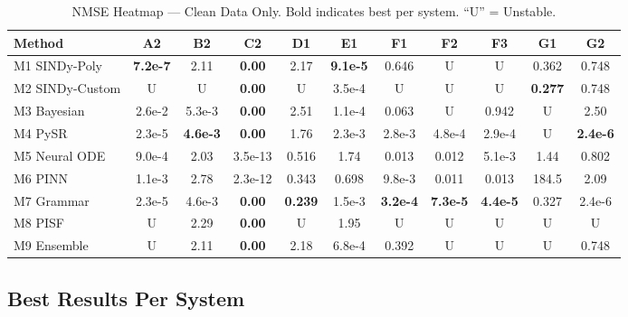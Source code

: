 \documentclass[conference]{IEEEtran}
\begin{document}
\begin{table}[!ht]
\centering
\caption{NMSE Heatmap --- Clean Data Only. Bold indicates best per system. ``U'' = Unstable.}
\label{tab:heatmap}
\small
\begin{tabular}{@{}l|cccccccccc@{}}
\toprule
\textbf{Method} & \textbf{A2} & \textbf{B2} & \textbf{C2} & \textbf{D1} & \textbf{E1} & \textbf{F1} & \textbf{F2} & \textbf{F3} & \textbf{G1} & \textbf{G2} \\
\midrule
M1 SINDy-Poly & \textbf{7.2e-7} & 2.11 & \textbf{0.00} & 2.17 & \textbf{9.1e-5} & 0.646 & U & U & 0.362 & 0.748 \\
M2 SINDy-Custom & U & U & \textbf{0.00} & U & 3.5e-4 & U & U & U & \textbf{0.277} & 0.748 \\
M3 Bayesian & 2.6e-2 & 5.3e-3 & \textbf{0.00} & 2.51 & 1.1e-4 & 0.063 & U & 0.942 & U & 2.50 \\
M4 PySR & 2.3e-5 & \textbf{4.6e-3} & \textbf{0.00} & 1.76 & 2.3e-3 & 2.8e-3 & 4.8e-4 & 2.9e-4 & U & \textbf{2.4e-6} \\
M5 Neural ODE & 9.0e-4 & 2.03 & 3.5e-13 & 0.516 & 1.74 & 0.013 & 0.012 & 5.1e-3 & 1.44 & 0.802 \\
M6 PINN & 1.1e-3 & 2.78 & 2.3e-12 & 0.343 & 0.698 & 9.8e-3 & 0.011 & 0.013 & 184.5 & 2.09 \\
M7 Grammar & 2.3e-5 & 4.6e-3 & \textbf{0.00} & \textbf{0.239} & 1.5e-3 & \textbf{3.2e-4} & \textbf{7.3e-5} & \textbf{4.4e-5} & 0.327 & 2.4e-6 \\
M8 PISF & U & 2.29 & \textbf{0.00} & U & 1.95 & U & U & U & U & U \\
M9 Ensemble & U & 2.11 & \textbf{0.00} & 2.18 & 6.8e-4 & 0.392 & U & U & U & 0.748 \\
\bottomrule
\end{tabular}
\end{table}

\subsection{Best Results Per System}
\end{document}
